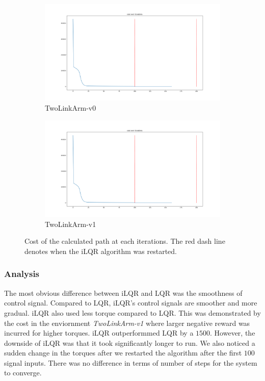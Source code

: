 \documentclass[hidelinks]{scrartcl}
\begin{document}
\begin{figure}[H]
	\centering
    \begin{subfigure}[b]{0.45\textwidth}
        \includegraphics[width=\textwidth]{figures/ilqr2-cost1}
        \caption{TwoLinkArm-v0}
    \end{subfigure}
    \begin{subfigure}[b]{0.45\textwidth}
        \includegraphics[width=\textwidth]{figures/ilqr2-cost2}
        \caption{TwoLinkArm-v1}
    \end{subfigure}
    \caption{Cost of the calculated path at each iterations. The red dash line denotes when the iLQR algorithm was restarted.}\label{fig:iLQR_cost}
\end{figure}
\subsubsection*{Analysis}
The most obvious difference between iLQR and LQR was the smoothness of control signal. Compared to LQR, iLQR's control signals are smoother and more gradual. iLQR also used less torque compared to LQR. This was demonstrated by the cost in the enviornment \textit{TwoLinkArm-v1} where larger negative reward was incurred for higher torques. iLQR outperformmed LQR by a $1500$. However, the downside of iLQR was that it took significantly longer to run. We also noticed a sudden change in the torques after we restarted the algorithm after the first $100$ signal inputs. There was no difference in terms of number of steps for the system to converge.
\end{document}
